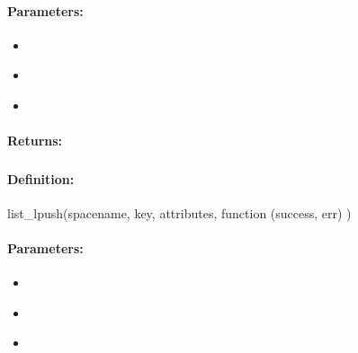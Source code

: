\paragraph{Parameters:}
\begin{itemize}[noitemsep]
\item {}\\

\item {}\\

\item {}\\

\end{itemize}

\paragraph{Returns:}


\pagebreak
\subsubsection{}
\label{api:nodejs:list_lpush}


\paragraph{Definition:}
\begin{javascriptcode}
list_lpush(spacename, key, attributes, function (success, err) {})
\end{javascriptcode}
\paragraph{Parameters:}
\begin{itemize}[noitemsep]
\item {}\\

\item {}\\

\item {}\\

\end{itemize}

